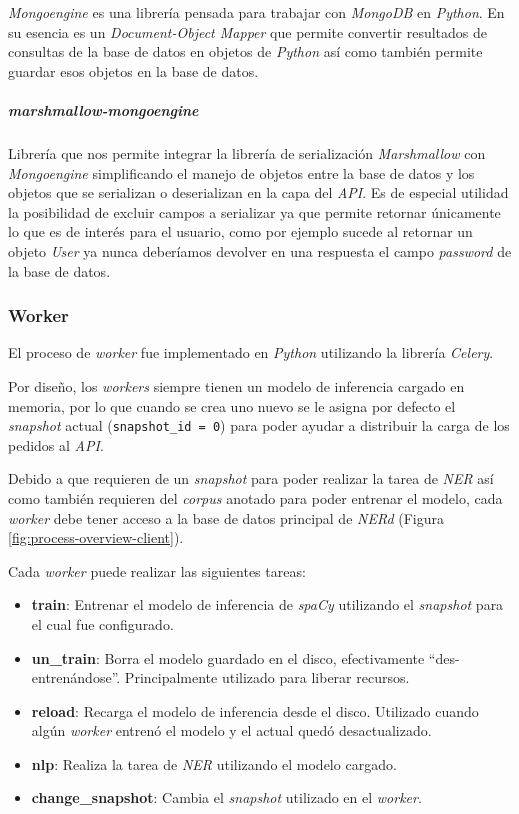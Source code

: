 \documentclass[12pt,a4paper,]{scrartcl}
\providecommand{\tightlist}{%
  \setlength{\itemsep}{0pt}\setlength{\parskip}{0pt}}
\let\oldsubparagraph\subparagraph
\renewcommand{\subparagraph}[1]{\oldsubparagraph{#1}\mbox{}}
\begin{document}
\emph{Mongoengine} es una librería pensada para trabajar con \emph{MongoDB} en \emph{Python}. En su esencia es un \emph{Document-Object Mapper} que permite convertir resultados de consultas de la base de datos en objetos de \emph{Python} así como también permite guardar esos objetos en la base de datos.

\hypertarget{marshmallow-mongoengine}{%
\subparagraph{\texorpdfstring{\emph{marshmallow-mongoengine}}{marshmallow-mongoengine}}\label{marshmallow-mongoengine}}

Librería que nos permite integrar la librería de serialización \emph{Marshmallow} con \emph{Mongoengine} simplificando el manejo de objetos entre la base de datos y los objetos que se serializan o deserializan en la capa del \emph{API}. Es de especial utilidad la posibilidad de excluir campos a serializar ya que permite retornar únicamente lo que es de interés para el usuario, como por ejemplo sucede al retornar un objeto \emph{User} ya nunca deberíamos devolver en una respuesta el campo \emph{password} de la base de datos.

\hypertarget{worker-1}{%
\subsubsection{Worker}\label{worker-1}}

El proceso de \emph{worker} fue implementado en \emph{Python} utilizando la librería \emph{Celery}.

Por diseño, los \emph{workers} siempre tienen un modelo de inferencia cargado en memoria, por lo que cuando se crea uno nuevo se le asigna por defecto el \emph{snapshot} actual (\texttt{snapshot\_id\ =\ 0}) para poder ayudar a distribuir la carga de los pedidos al \emph{API}.

Debido a que requieren de un \emph{snapshot} para poder realizar la tarea de \emph{NER} así como también requieren del \emph{corpus} anotado para poder entrenar el modelo, cada \emph{worker} debe tener acceso a la base de datos principal de \emph{NERd} (Figura \ref{fig:process-overview-client}).

Cada \emph{worker} puede realizar las siguientes tareas:

\begin{itemize}
\tightlist
\item
  \textbf{train}: Entrenar el modelo de inferencia de \emph{spaCy} utilizando el \emph{snapshot} para el cual fue configurado.
\item
  \textbf{un\_train}: Borra el modelo guardado en el disco, efectivamente \enquote{des-entrenándose}. Principalmente utilizado para liberar recursos.
\item
  \textbf{reload}: Recarga el modelo de inferencia desde el disco. Utilizado cuando algún \emph{worker} entrenó el modelo y el actual quedó desactualizado.
\item
  \textbf{nlp}: Realiza la tarea de \emph{NER} utilizando el modelo cargado.
\item
  \textbf{change\_snapshot}: Cambia el \emph{snapshot} utilizado en el \emph{worker}.
\end{itemize}
\end{document}
